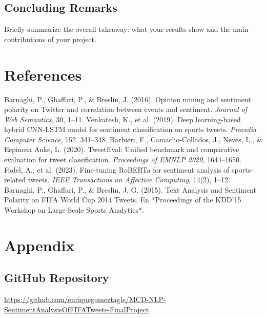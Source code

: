 \documentclass[10pt]{article}
\begin{document}
\subsection{Concluding Remarks}
Briefly summarize the overall takeaway: what your results show and the main contributions of your project.

\section{References}
\begin{thebibliography}{9}
 Barnaghi, P., Ghaffari, P., \& Breslin, J. (2016). Opinion mining and sentiment polarity on Twitter and correlation between events and sentiment. \textit{Journal of Web Semantics}, 30, 1–11.
 Venkatesh, K., et al. (2019). Deep learning-based hybrid CNN-LSTM model for sentiment classification on sports tweets. \textit{Procedia Computer Science}, 152, 341–348.
 Barbieri, F., Camacho-Collados, J., Neves, L., \& Espinosa Anke, L. (2020). TweetEval: Unified benchmark and comparative evaluation for tweet classification. \textit{Proceedings of EMNLP 2020}, 1644–1650.
 Fadel, A., et al. (2023). Fine-tuning RoBERTa for sentiment analysis of sports-related tweets. \textit{IEEE Transactions on Affective Computing}, 14(2), 1–12.
Barnaghi, P., Ghaffari, P., \& Breslin, J. G. (2015). Text Analysis and Sentiment Polarity on FIFA World Cup 2014 Tweets. En *Proceedings of the KDD’15 Workshop on Large-Scale Sports Analytics*.  
\end{thebibliography}
\section{Appendix}
\subsection{GitHub Repository}
\url{https://github.com/enriquegomeztagle/MCD-NLP-SentimentAnalysisOfFIFATweets-FinalProject}
\end{document}
